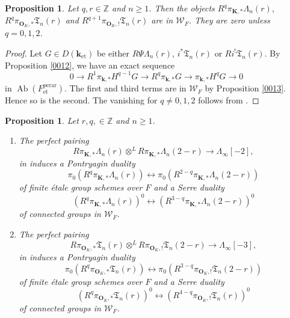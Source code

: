 \documentclass{amsart}
\newtheorem{Prop}[Thm]{Proposition}
\theoremstyle{remark}
\numberwithin{equation}{section}
\newcommand{\tensor}{\mathbin{\otimes}}
\newcommand{\Z}{\mathbb{Z}}
\newcommand{\et}{\mathrm{et}}
\newcommand{\perar}{\mathrm{perar}}
\newcommand{\alg}[1]{\mathbf{#1}}
\DeclareMathOperator{\Ab}{Ab}
\begin{document}
\begin{Prop} \label{0014}
	Let $q, r \in \Z$ and $n \ge 1$.
	Then the objects $R^{q} \pi_{\alg{K}, \ast} \Lambda_{n}(r)$,
	$R^{q} \pi_{\alg{O}_{K}, \ast} \mathfrak{T}_{n}(r)$ and
	$R^{q + 1} \pi_{\alg{O}_{K}, !} \mathfrak{T}_{n}(r)$ are in $\mathcal{W}_{F}$.
	They are zero unless $q = 0, 1, 2$.
\end{Prop}

\begin{proof}
	Let $G \in D(\alg{k}_{\et})$ be either $R \Psi \Lambda_{n}(r)$,
	$i^{\ast} \mathfrak{T}_{n}(r)$ or
	$R i^{!} \mathfrak{T}_{n}(r)$.
	By Proposition \ref{0012},
	we have an exact sequence
		\[
				0
			\to
				R^{1} \pi_{\alg{k}, \ast} H^{q - 1} G
			\to
				R^{q} \pi_{\alg{k}, \ast} G
			\to
				\pi_{\alg{k}, \ast} H^{q} G
			\to
				0
		\]
	in $\Ab(F^{\perar}_{\et})$.
	The first and third terms are in $\mathcal{W}_{F}$
	by Proposition \ref{0013}.
	Hence so is the second.
	The vanishing for $q \ne 0, 1, 2$ follows from
	\cite[Propositions 6.2.1 and 6.5.1]{Suz24}.
\end{proof}

\begin{Prop} \label{0016}
	Let $r, q, \in \Z$ and $n \ge 1$.
	\begin{enumerate}
		\item
			The perfect pairing
				\[
							R \pi_{\alg{K}, \ast} \Lambda_{n}(r)
						\tensor^{L}
							R \pi_{\alg{K}, \ast} \Lambda_{n}(2 - r)
					\to
						\Lambda_{\infty}[-2],
				\]
			in \cite[Proposition 6.2.2]{Suz24} induces a Pontryagin duality
				\[
						\pi_{0}(R^{q} \pi_{\alg{K}, \ast} \Lambda_{n}(r))
					\leftrightarrow
						\pi_{0}(R^{2 - q} \pi_{\alg{K}, \ast} \Lambda_{n}(2 - r))
				\]
			of finite \'etale group schemes over $F$ and a Serre duality
				\[
						(R^{q} \pi_{\alg{K}, \ast} \Lambda_{n}(r))^{0}
					\leftrightarrow
						(R^{3 - q} \pi_{\alg{K}, \ast} \Lambda_{n}(2 - r))^{0}
				\]
			of connected groups in $\mathcal{W}_{F}$.
		\item
			The perfect pairing
				\[
							R \pi_{\alg{O}_{K}, \ast} \mathfrak{T}_{n}(r)
						\tensor^{L}
							R \pi_{\alg{O}_{K}, !} \mathfrak{T}_{n}(2 - r)
					\to
						\Lambda_{\infty}[-3],
				\]
			in \cite[Proposition 6.5.1]{Suz24} induces a Pontryagin duality
				\[
						\pi_{0}(R^{q} \pi_{\alg{O}_{K}, \ast} \mathfrak{T}_{n}(r))
					\leftrightarrow
						\pi_{0}(R^{3 - q} \pi_{\alg{O}_{K}, !} \mathfrak{T}_{n}(2 - r))
				\]
			of finite \'etale group schemes over $F$ and a Serre duality
				\[
						(R^{q} \pi_{\alg{O}_{K}, \ast} \mathfrak{T}_{n}(r))^{0}
					\leftrightarrow
						(R^{4 - q} \pi_{\alg{O}_{K}, !} \mathfrak{T}_{n}(r))^{0}
				\]
			of connected groups in $\mathcal{W}_{F}$.
	\end{enumerate}
\end{Prop}
\end{document}
